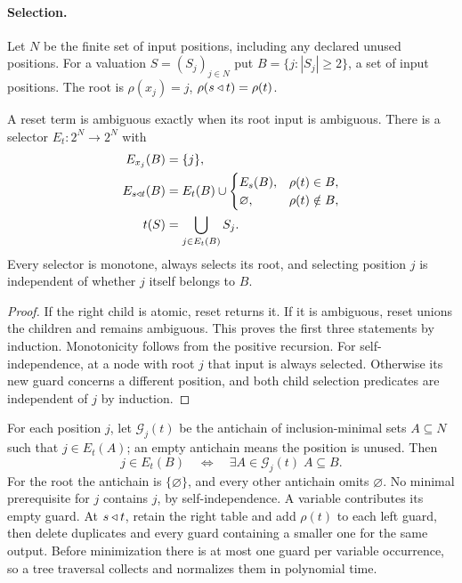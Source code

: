 \paragraph{Selection.}
Let $N$ be the finite set of input positions, including any declared unused positions. For a valuation $S=(S_j)_{j\in N}$ put $B=\{j:|S_j|\geq2\}$, a set of input positions. The root is
$\rho(x_j)=j$, $\rho(s\mathbin{\triangleleft} t)=\rho(t)$.

\begin{lemma}\label{reset:lem:selection}
A reset term is ambiguous exactly when its root input is ambiguous.
There is a selector $E_t:2^N\to2^N$ with
\begin{align*}
 E_{x_j}(B)&=\{j\},\\
 E_{s\mathbin{\triangleleft} t}(B)&=E_t(B)\cup
 \begin{cases}E_s(B),&\rho(t)\in B,\\\varnothing,&\rho(t)\notin B,\end{cases}\\
 t(S)&=\bigcup_{j\in E_t(B)}S_j.
\end{align*}
Every selector is monotone, always selects its root, and selecting
position $j$ is independent of whether $j$ itself belongs to $B$.
\end{lemma}
\begin{proof}
If the right child is atomic, reset returns it. If it is ambiguous,
reset unions the children and remains ambiguous. This proves the first
three statements by induction. Monotonicity follows from the positive
recursion. For self-independence, at a node with root $j$ that input is
always selected. Otherwise its new guard concerns a different position,
and both child selection predicates are independent of $j$ by induction.
\end{proof}

For each position $j$, let $\mathcal G_j(t)$ be the antichain of inclusion-minimal sets $A\subseteq N$ such that $j\in E_t(A)$; an empty antichain means the position is unused. Then
\begin{equation}\label{reset:eq:guards}
 j\in E_t(B)\quad\Longleftrightarrow\quad
       \exists A\in\mathcal G_j(t)\; A\subseteq B.
\end{equation}
For the root the antichain is $\{\varnothing\}$, and every other antichain omits $\varnothing$. No minimal prerequisite for $j$ contains $j$, by self-independence. A variable contributes its empty guard. At $s\mathbin{\triangleleft} t$, retain the right table and add $\rho(t)$ to each left guard, then
delete duplicates and every guard containing a smaller one for the same output. Before minimization there is at most one guard per variable occurrence, so a tree traversal collects and normalizes them in polynomial time.

